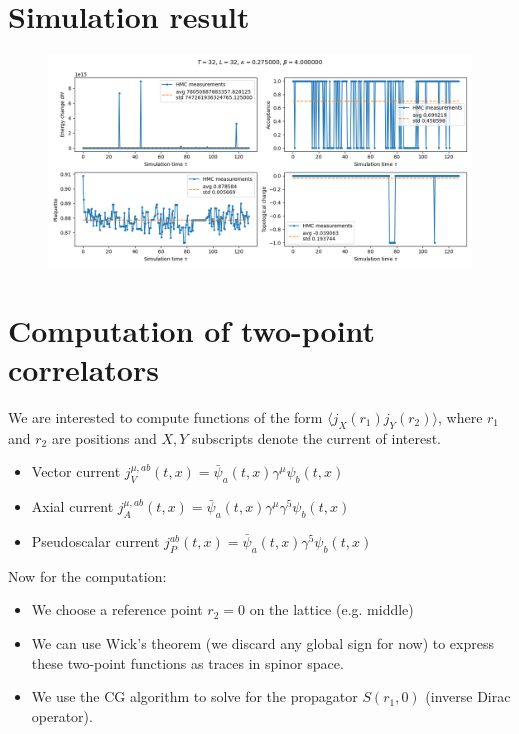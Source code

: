 \documentclass{article}
\begin{document}
\section{Simulation result}

\begin{figure}[H]
    \centering
    \includegraphics[width=\textwidth]{../plots/general.png}
\end{figure}

\section{Computation of two-point correlators}

We are interested to compute functions of the form $\langle j_X(r_1) j_Y(r_2) \rangle$, 
where $r_1$ and $r_2$ are positions and $X, Y$ subscripts denote the current of interest.

\begin{itemize}
    \item Vector current $j_V^{\mu, ab}(t, x) = \bar\psi_a(t, x) \gamma^\mu \psi_b(t, x)$
    \item Axial current $j_A^{\mu, ab}(t, x) = \bar\psi_a(t, x) \gamma^\mu \gamma^5 \psi_b(t, x)$
    \item Pseudoscalar current $j_P^{ab}(t, x) = \bar\psi_a(t, x) \gamma^5 \psi_b(t, x)$
\end{itemize}

Now for the computation:

\begin{itemize}
    \item We choose a reference point $r_2=0$ on the lattice (e.g. middle)
    \item We can use Wick's theorem (we discard any global sign for now) to express these two-point functions as traces in spinor space.
    \item We use the CG algorithm to solve for the propagator $S(r_1, 0)$ (inverse Dirac operator). 
\end{itemize}
\end{document}
